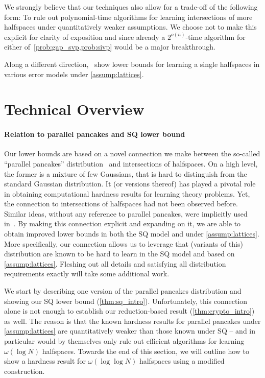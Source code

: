 \documentclass{theoretics}
\begin{document}
We strongly believe that our techniques also allow for a trade-off of the following form:
To rule out polynomial-time algorithms for learning intersections of more halfspaces under quantitatively weaker assumptions.
We choose not to make this explicit for clarity of exposition and since already a $2^{o(n)}$-time algorithm for either of~\cref{prob:gap_svp,prob:sivp} would be a major breakthrough.

Along a different direction,~\cite{tiegel_agnostic_lattices,diakonikolas_massart_lwe,diakonikolas2023near} show lower bounds for learning a single halfspaces in various error models under \cref{assump:lattices}.

\section{Technical Overview}
\label{sec:techniques}

\paragraph{Relation to parallel pancakes and SQ lower bound}

Our lower bounds are based on a novel connection we make between the so-called ``parallel pancakes'' distribution~\cite{DKS17,bubeck2019adversarial,CLWE} and intersections of halfspaces.
On a high level, the former is a mixture of few Gaussians, that is hard to distinguish from the standard Gaussian distribution.
It (or versions thereof) has played a pivotal role in obtaining computational hardness results for learning theory problems.
Yet, the connection to intersections of halfspaces had not been observed before.
Similar ideas, without any reference to parallel pancakes, were implicitly used in~\cite{klivans2009cryptographic}.
By making this connection explicit and expanding on it, we are able to obtain improved lower bounds in both the SQ model and under \cref{assump:lattices}.
More specifically, our connection allows us to leverage that (variants of this) distribution are known to be hard to learn in the SQ model and based on \cref{assump:lattices}.
Fleshing out all details and satisfying all distribution requirements exactly will take some additional work.

We start by describing one version of the parallel pancakes distribution and showing our SQ lower bound (\cref{thm:sq_intro}).
Unfortunately, this connection alone is not enough to establish our reduction-based result (\cref{thm:crypto_intro}) as well.
The reason is that the known hardness results for parallel pancakes under \cref{assump:lattices} are quantitatively weaker than those known under SQ -- and in particular would by themselves only rule out efficient algorithms for learning $\omega(\log N)$ halfspaces.
Towards the end of this section, we will outline how to show a hardness result for $\omega(\log \log N)$ halfspaces using a modified construction.
\end{document}
